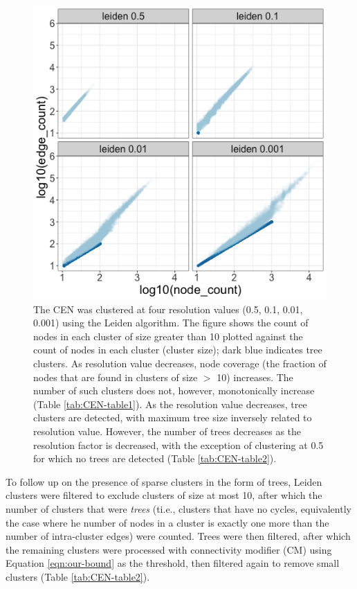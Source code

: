 \documentclass[11pt]{article}   	%
\begin{document}
\begin{figure}[h]
\centering
\includegraphics[width=0.4\linewidth]{figs/cen_quad_fig1.png}
\caption{The CEN was clustered at four resolution values (0.5, 0.1, 0.01, 0.001) using the Leiden algorithm.
The figure shows the count of nodes in each cluster of size greater than 10 plotted against the count of nodes in each cluster (cluster size); dark blue indicates tree clusters.
As resolution value decreases, node coverage (the fraction of nodes that are found in clusters of size $>$  10) increases. The number of such clusters does not, however, monotonically increase (Table \ref{tab:CEN-table1}). As the resolution value decreases, tree clusters are detected, with maximum tree size inversely related to resolution value. However, the number of trees decreases as the resolution factor is decreased, with the exception of clustering at 0.5 for which no trees are detected (Table \ref{tab:CEN-table2}).}
\end{figure}

To follow up on the presence of sparse clusters in the form of trees, Leiden clusters were filtered to exclude clusters of size at most 10, after which the number of clusters that were \emph{trees} (ti.e., clusters that have no cycles, equivalently the case where he number of nodes in a cluster is exactly  one more than the number of intra-cluster edges) were counted. Trees were then filtered, after which the remaining clusters were processed with connectivity modifier (CM) using Equation \ref{eqn:our-bound} as the threshold, then filtered again to remove small clusters (Table \ref{tab:CEN-table2}).

\end{document}
